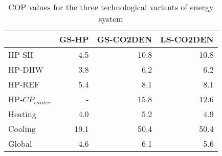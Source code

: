 \begin{table}[htp]
\centering
\caption{COP values for the three technological variants of energy system}\vspace{2mm}
\label{tab:V_cops} 
\begin{tabular}{lrrr}
	\toprule
	& GS-HP & GS-CO2DEN & LS-CO2DEN \\ \midrule
	HP-SH            & 4.5  & 10.8    & 10.8    \\
	HP-DHW           & 3.8  & 6.2     & 6.2     \\
	HP-REF           & 5.4  & 8.1     & 8.1     \\
	HP-$CP_{winter}$ & -    & 15.8    & 12.6    \\
	Heating          & 4.0  & 5.2     & 4.9     \\
	Cooling          & 19.1 & 50.4      & 50.4      \\
	Global           & 4.6  & 6.1     & 5.6    \\ \bottomrule
\end{tabular}
\end{table}
